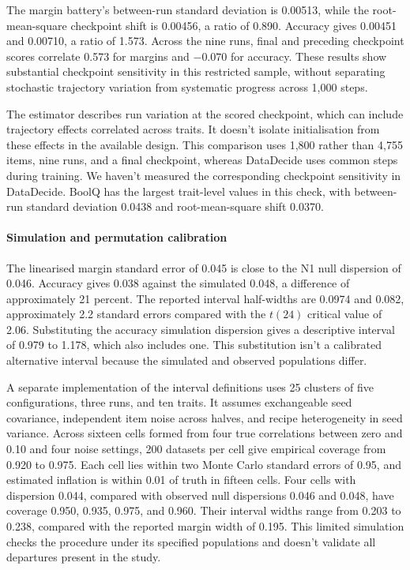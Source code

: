 The margin battery's between-run standard deviation is 0.00513, while the root-mean-square checkpoint shift is 0.00456, a ratio of 0.890. Accuracy gives 0.00451 and 0.00710, a ratio of 1.573. Across the nine runs, final and preceding checkpoint scores correlate 0.573 for margins and $-0.070$ for accuracy. These results show substantial checkpoint sensitivity in this restricted sample, without separating stochastic trajectory variation from systematic progress across 1,000 steps.

The estimator describes run variation at the scored checkpoint, which can include trajectory effects correlated across traits. It doesn't isolate initialisation from these effects in the available design. This comparison uses 1,800 rather than 4,755 items, nine runs, and a final checkpoint, whereas DataDecide uses common steps during training. We haven't measured the corresponding checkpoint sensitivity in DataDecide. BoolQ has the largest trait-level values in this check, with between-run standard deviation 0.0438 and root-mean-square shift 0.0370.

\paragraph{Simulation and permutation calibration}
The linearised margin standard error of 0.045 is close to the N1 null dispersion of 0.046. Accuracy gives 0.038 against the simulated 0.048, a difference of approximately 21 percent. The reported interval half-widths are 0.0974 and 0.082, approximately 2.2 standard errors compared with the $t(24)$ critical value of 2.06. Substituting the accuracy simulation dispersion gives a descriptive interval of 0.979 to 1.178, which also includes one. This substitution isn't a calibrated alternative interval because the simulated and observed populations differ.

A separate implementation of the interval definitions uses 25 clusters of five configurations, three runs, and ten traits. It assumes exchangeable seed covariance, independent item noise across halves, and recipe heterogeneity in seed variance. Across sixteen cells formed from four true correlations between zero and 0.10 and four noise settings, 200 datasets per cell give empirical coverage from 0.920 to 0.975. Each cell lies within two Monte Carlo standard errors of 0.95, and estimated inflation is within 0.01 of truth in fifteen cells. Four cells with dispersion 0.044, compared with observed null dispersions 0.046 and 0.048, have coverage 0.950, 0.935, 0.975, and 0.960. Their interval widths range from 0.203 to 0.238, compared with the reported margin width of 0.195. This limited simulation checks the procedure under its specified populations and doesn't validate all departures present in the study.

